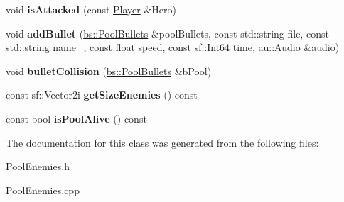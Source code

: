 \begin{DoxyCompactItemize}
void {\bfseries is\+Attacked} (const \hyperlink{class_player}{Player} \&Hero)
\item 
\mbox{\label{class_pool_enemies_a82638c91745fa4d84425261547543e7e}} 
void {\bfseries add\+Bullet} (\hyperlink{classbs_1_1_pool_bullets}{bs\+::\+Pool\+Bullets} \&pool\+Bullets, const std\+::string file, const std\+::string name\+\_\+, const float speed, const sf\+::\+Int64 time, \hyperlink{classau_1_1_audio}{au\+::\+Audio} \&audio)
\item 
\mbox{\label{class_pool_enemies_ae15fce84d594589152deaabf8dc166bf}} 
void {\bfseries bullet\+Collision} (\hyperlink{classbs_1_1_pool_bullets}{bs\+::\+Pool\+Bullets} \&b\+Pool)
\item 
\mbox{\label{class_pool_enemies_ad5312d398eaa044a92cc5fe52ac34d42}} 
const sf\+::\+Vector2i {\bfseries get\+Size\+Enemies} () const
\item 
\mbox{\label{class_pool_enemies_ab35e745455dd4778ae8b121af7c522e1}} 
const bool {\bfseries is\+Pool\+Alive} () const
\end{DoxyCompactItemize}


The documentation for this class was generated from the following files\+:\begin{DoxyCompactItemize}
\item 
Pool\+Enemies.\+h\item 
Pool\+Enemies.\+cpp\end{DoxyCompactItemize}
